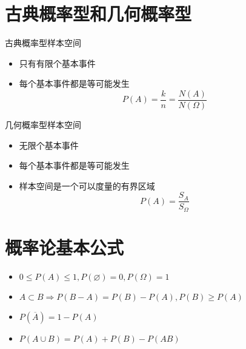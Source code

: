 \section{古典概率型和几何概率型}

\begin{definition}[古典概率型]
	古典概率型样本空间
	\begin{itemize}
		\item 只有有限个基本事件
		\item 每个基本事件都是等可能发生
		$$P(A) = \dfrac{k}{n} = \dfrac{N(A)}{N(\Omega)}$$
	\end{itemize}
\end{definition}
\begin{definition}[几何概率型]
	几何概率型样本空间
	\begin{itemize}
		\item 无限个基本事件
		\item 每个基本事件都是等可能发生
		\item 样本空间是一个可以度量的有界区域
		$$P(A) = \dfrac{S_{A}}{S_{\Omega}}$$
	\end{itemize}
\end{definition}

\section{概率论基本公式}
\begin{definition}[性质和基本公式]
	\begin{itemize}
		\item $0 \leq P(A)\leq 1, P(\varnothing) = 0,P(\Omega) = 1$
		\item $A\subset B\Rightarrow P(B-A) = P(B)-P(A), P(B)\geq P(A)$
		\item $P(\overline{A}) = 1 - P(A)$
		\item $P(A\cup B) = P(A) + P(B) - P(AB)$
	\end{itemize}
\end{definition}

